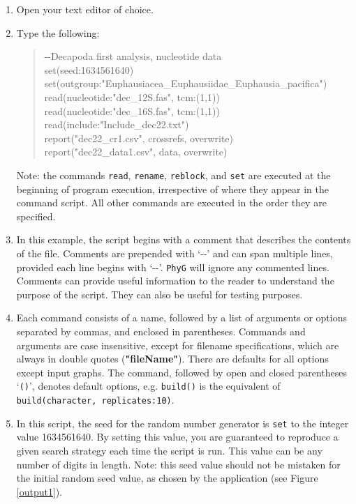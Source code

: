 \documentclass[11pt]{article}
\newcommand{\phyg}{\texttt{PhyG} }
\begin{document}
\begin{enumerate}

\item Open your text editor of choice.

\item Type the following:

	\begin{quote}	
	-\/-Decapoda first analysis, nucleotide data\\
	set(seed:1634561640)\\
	set(outgroup:"Euphausiacea\_Euphausiidae\_Euphausia\_pacifica")\\
	read(nucleotide:"dec\_12S.fas", tcm:(1,1))\\
	read(nucleotide:"dec\_16S.fas", tcm:(1,1))\\
	read(include:"Include\_dec22.txt")\\
	report("dec22\_cr1.csv", crossrefs, overwrite)\\
	report("dec22\_data1.csv", data, overwrite)\\
	\end{quote}
	
Note: the commands \texttt{read}, \texttt{rename}, \texttt{reblock}, and \texttt{set} 
are executed at the beginning of program execution, irrespective of where they 
appear in the command script. All other commands are executed in the order they 
are specified.

\item In this example, the script begins with a comment that describes the 
contents of the file. Comments are prepended with `-{}-' and can span multiple 
lines, provided each line begins with `-{}-'. \phyg will ignore any commented 
lines. Comments can provide useful information to the reader to understand 
the purpose of the script. They can also be useful for testing purposes.

\item Each command consists of a name, followed by a list of arguments or options 
separated by commas, and enclosed in parentheses. Commands and arguments are 
case insensitive, except for filename specifications, which are always in 
double quotes (\textbf{"fileName"}). There are defaults for all options except 
input graphs. The command, followed by open and closed parentheses `\texttt{()}',
denotes default options, e.g. \texttt{build()} is the equivalent of \texttt{build(character, 
replicates:10)}.

\item In this script, the seed for the random number generator is \texttt{set} to 
the integer value 1634561640. By setting this value, you are guaranteed to reproduce 
a given search strategy each time the script is run. This value can be any number of 
digits in length. Note: this seed value should not be mistaken for the initial random
seed value, as chosen by the application (see Figure \ref{output1}).


\end{enumerate}
\end{document}
